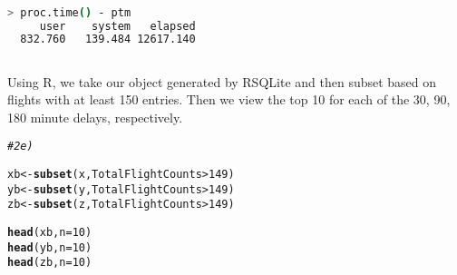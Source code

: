 \documentclass{article}\usepackage[]{graphicx}\usepackage[]{color}
\makeatletter
\newcommand{\hlnum}[1]{\textcolor[rgb]{0.686,0.059,0.569}{#1}}%
\newcommand{\hlcom}[1]{\textcolor[rgb]{0.678,0.584,0.686}{\textit{#1}}}%
\newcommand{\hlopt}[1]{\textcolor[rgb]{0,0,0}{#1}}%
\newcommand{\hlstd}[1]{\textcolor[rgb]{0.345,0.345,0.345}{#1}}%
\newcommand{\hlkwb}[1]{\textcolor[rgb]{0.69,0.353,0.396}{#1}}%
\newcommand{\hlkwc}[1]{\textcolor[rgb]{0.333,0.667,0.333}{#1}}%
\newcommand{\hlkwd}[1]{\textcolor[rgb]{0.737,0.353,0.396}{\textbf{#1}}}%
\newenvironment{kframe}{%
 \def\at@end@of@kframe{}%
 \ifinner\ifhmode%
  \def\at@end@of@kframe{\end{minipage}}%
  \begin{minipage}{\columnwidth}%
 \fi\fi%
 \def\FrameCommand##1{\hskip\@totalleftmargin \hskip-\fboxsep
 \colorbox{shadecolor}{##1}\hskip-\fboxsep
     \hskip-\linewidth \hskip-\@totalleftmargin \hskip\columnwidth}%
 \MakeFramed {\advance\hsize-\width
   \@totalleftmargin\z@ \linewidth\hsize
   \@setminipage}}%
 {\par\unskip\endMakeFramed%
 \at@end@of@kframe}
\newenvironment{knitrout}{}{} %
\makeatother
\begin{document}
\begin{lstlisting}[language=bash,caption={Timing for all\_preprocess.sh}]

> proc.time() - ptm
     user    system   elapsed 
  832.760   139.484 12617.140

\end{lstlisting}

\subsection{}

Using R, we take our object generated by RSQLite and then subset based on flights with at least 150 entries.  Then we view the top 10 for each of the 30, 90, 180 minute delays, respectively.

\begin{knitrout}
\color{fgcolor}\begin{kframe}
\begin{alltt}
\hlcom{# 2e)}

\hlstd{xb} \hlkwb{<-} \hlkwd{subset}\hlstd{(x, TotalFlightCounts} \hlopt{>} \hlnum{149}\hlstd{)}
\hlstd{yb} \hlkwb{<-} \hlkwd{subset}\hlstd{(y, TotalFlightCounts} \hlopt{>} \hlnum{149}\hlstd{)}
\hlstd{zb} \hlkwb{<-} \hlkwd{subset}\hlstd{(z, TotalFlightCounts} \hlopt{>} \hlnum{149}\hlstd{)}

\hlkwd{head}\hlstd{(xb,}\hlkwc{n}\hlstd{=}\hlnum{10}\hlstd{)}
\hlkwd{head}\hlstd{(yb,}\hlkwc{n}\hlstd{=}\hlnum{10}\hlstd{)}
\hlkwd{head}\hlstd{(zb,}\hlkwc{n}\hlstd{=}\hlnum{10}\hlstd{)}
\end{alltt}
\end{kframe}
\end{knitrout}
\end{document}
